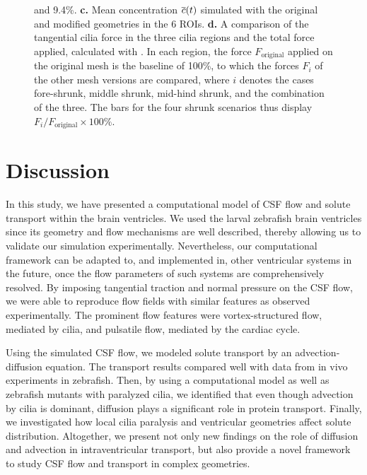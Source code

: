 \documentclass{WileyMSP-template}
\begin{document}
\begin{figure}
{    and 9.4\%.
    \textbf{c.} Mean concentration $\overline{c}(t)$ simulated with the original and modified geometries
    in the 6 ROIs.
    \textbf{d.} A comparison of the tangential cilia force in the three cilia regions
    and the total force applied, calculated with .
    In each region, the force $F_{\mathrm{original}}$ 
    applied on the original mesh is the baseline of 100\%,
    to which the forces $F_i$ of the other mesh versions are compared, where $i$ denotes
    the cases fore-shrunk, middle shrunk, mid-hind shrunk, and the combination of the three.
    The bars for the four shrunk scenarios thus
    display $F_i/F_{\mathrm{original}}\times 100\%$.}
    \label{fig:fig6}
\end{figure}

\section{Discussion}
In this study, we have presented a computational model of CSF flow and
solute transport within the brain ventricles.
We used the larval zebrafish brain ventricles since its geometry and
flow mechanisms are well described, thereby allowing us to validate
our simulation experimentally. Nevertheless, our computational framework can be adapted to,
and implemented in, other ventricular systems in the future, once the flow parameters of such systems
are comprehensively resolved. By imposing tangential traction and normal pressure
on the CSF flow, we were able to reproduce flow fields with similar features
as observed experimentally. The prominent flow features were vortex-structured flow,
mediated by cilia, and pulsatile flow, mediated by the cardiac cycle.

Using the simulated CSF flow, we modeled solute transport by an advection-diffusion equation.
The transport results compared well with data from in vivo experiments in zebrafish.
Then, by using a computational model as well as zebrafish mutants with paralyzed cilia,
we identified that even though advection by cilia is dominant,
diffusion plays a significant role in protein transport.
Finally, we investigated how local cilia paralysis and ventricular geometries
affect solute distribution. Altogether, we present not only new findings on the role of
diffusion and advection in intraventricular transport, but also provide a novel framework to
study CSF flow and transport in complex geometries.
\end{document}
